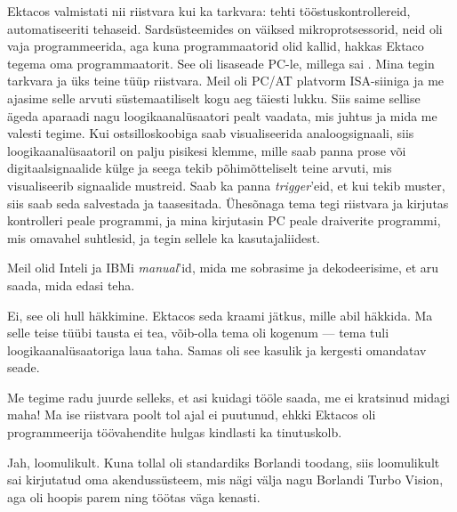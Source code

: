 Ektacos valmistati nii riistvara kui ka tarkvara: tehti 
tööstuskontrollereid, automatiseeriti tehaseid. Sardsüsteemides on väiksed mikroprotsessorid, neid oli vaja programmeerida, aga 
kuna programmaatorid olid kallid, hakkas Ektaco tegema oma 
programmaatorit. See oli lisaseade PC-le, millega sai
. Mina tegin tarkvara ja üks teine tüüp riistvara. Meil oli 
PC/AT platvorm ISA-siiniga ja me ajasime selle arvuti süstemaatiliselt kogu aeg 
täiesti lukku. Siis saime sellise ägeda aparaadi nagu
loogikaanalüsaatori pealt vaadata, mis juhtus ja mida me 
valesti tegime. Kui 
ostsilloskoobiga saab visualiseerida analoogsignaali, siis 
loogikaanalüsaatoril on palju pisikesi klemme, mille saab panna prose 
või digitaalsignaalide külge ja seega tekib põhimõtteliselt teine arvuti, mis  
visualiseerib signaalide mustreid. Saab ka panna 
\emph{trigger}'eid, et kui tekib muster, siis saab seda salvestada ja 
taasesitada. Ühesõnaga tema tegi riistvara ja kirjutas  
kontrolleri peale programmi, ja mina kirjutasin PC peale 
draiverite programmi, mis omavahel suhtlesid, ja tegin sellele ka 
kasutajaliidest.

Meil olid Inteli ja IBMi \emph{manual}'id, mida me 
sobrasime ja dekodeerisime, et aru saada, mida edasi teha. 



Ei, see oli hull häkkimine. Ektacos seda kraami jätkus, mille abil häkkida. Ma selle 
teise tüübi tausta ei tea, võib-olla tema oli kogenum --- tema tuli 
loogikaanalüsaatoriga laua taha. Samas oli see 
kasulik ja kergesti omandatav seade. 


Me tegime radu juurde selleks, et asi kuidagi tööle saada, me ei 
kratsinud midagi maha! Ma ise riistvara poolt tol ajal ei puutunud, ehkki 
Ektacos oli programmeerija töövahendite hulgas kindlasti ka tinutuskolb. 



Jah, loomulikult. Kuna tollal oli standardiks Borlandi
toodang, siis loomulikult sai kirjutatud oma akendussüsteem, mis nägi välja nagu 
Borlandi Turbo Vision, aga oli hoopis parem ning töötas väga 
kenasti. 

